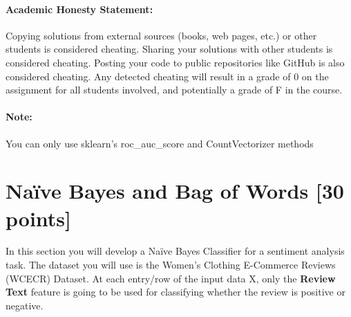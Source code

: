 \documentclass[letterpaper]{article}
\begin{document}
\paragraph*{Academic Honesty Statement:} Copying solutions from external sources (books, web pages, etc.) or other students is considered cheating. Sharing your solutions with other students is  considered cheating. Posting your code to public repositories like GitHub is also considered cheating. Any detected cheating will result in a grade of 0 on the assignment for all students involved, and potentially a grade of F in the course.

\paragraph*{Note:} You can only use sklearn's roc\_auc\_score and CountVectorizer methods \\


\section{Na\"ive Bayes and Bag of Words [30 points]}
\noindent In this section you will develop a Na\"ive Bayes Classifier for a sentiment analysis task. The dataset you will use is the Women's Clothing E-Commerce Reviews (WCECR) Dataset. At each entry/row of the input data X, only the \textbf{Review Text} feature is going to be used for classifying whether the review is positive or negative.\\
\end{document}
